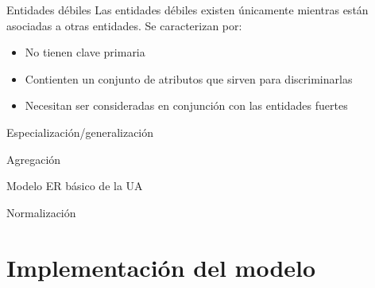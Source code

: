 \documentclass{classes/beamer_GeomaticaUA}
\begin{document}
\begin{frame}{Entidades débiles}
Las entidades débiles existen únicamente mientras están asociadas a otras entidades. Se caracterizan por:
\begin{itemize}
\item No tienen clave primaria
\item Contienten un conjunto de atributos que sirven para discriminarlas
\item Necesitan ser consideradas en conjunción con las entidades fuertes
\end{itemize}

\begin{center}
\resizebox{\textheight}{!}{}
\end{center}

\end{frame}

\begin{frame}{Especialización/generalización}

\begin{center}
\resizebox{0.6\paperheight}{!}{}
\end{center}

\end{frame}

\begin{frame}{Agregación}

\begin{center}
\resizebox{0.8\textheight}{!}{}
\end{center}

\end{frame}

\begin{frame}{Modelo ER básico de la UA}


\begin{center}
\resizebox{!}{0.6\textwidth}{}
\end{center}


\end{frame}

\begin{frame}{Normalización}

\end{frame}

\section[Implementación]{Implementación del modelo}
\end{document}
